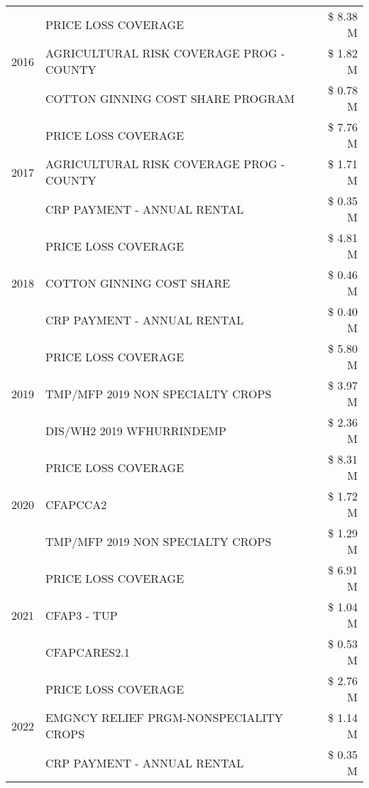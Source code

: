 \begin{tabular}{llr}
\cline{1-3}
\multirow[t]{3}{*}{2016} & PRICE LOSS COVERAGE & \$ 8.38 M \\
 & AGRICULTURAL RISK COVERAGE PROG - COUNTY & \$ 1.82 M \\
 & COTTON GINNING COST SHARE PROGRAM & \$ 0.78 M \\
\cline{1-3}
\multirow[t]{3}{*}{2017} & PRICE LOSS COVERAGE & \$ 7.76 M \\
 & AGRICULTURAL RISK COVERAGE PROG - COUNTY & \$ 1.71 M \\
 & CRP PAYMENT - ANNUAL RENTAL & \$ 0.35 M \\
\cline{1-3}
\multirow[t]{3}{*}{2018} & PRICE LOSS COVERAGE & \$ 4.81 M \\
 & COTTON GINNING COST SHARE & \$ 0.46 M \\
 & CRP PAYMENT - ANNUAL RENTAL & \$ 0.40 M \\
\cline{1-3}
\multirow[t]{3}{*}{2019} & PRICE LOSS COVERAGE & \$ 5.80 M \\
 & TMP/MFP 2019 NON SPECIALTY CROPS & \$ 3.97 M \\
 & DIS/WH2 2019 WFHURRINDEMP & \$ 2.36 M \\
\cline{1-3}
\multirow[t]{3}{*}{2020} & PRICE LOSS COVERAGE & \$ 8.31 M \\
 & CFAPCCA2 & \$ 1.72 M \\
 & TMP/MFP 2019 NON SPECIALTY CROPS & \$ 1.29 M \\
\cline{1-3}
\multirow[t]{3}{*}{2021} & PRICE LOSS COVERAGE & \$ 6.91 M \\
 & CFAP3 - TUP & \$ 1.04 M \\
 & CFAPCARES2.1 & \$ 0.53 M \\
\cline{1-3}
\multirow[t]{3}{*}{2022} & PRICE LOSS COVERAGE & \$ 2.76 M \\
 & EMGNCY RELIEF PRGM-NONSPECIALITY CROPS & \$ 1.14 M \\
 & CRP PAYMENT - ANNUAL RENTAL & \$ 0.35 M \\
\cline{1-3}
\bottomrule
\end{tabular}
